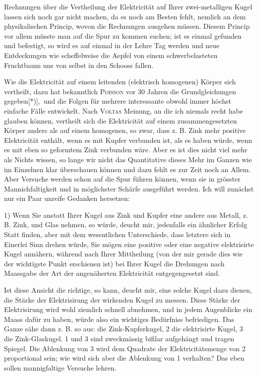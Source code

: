 Rechnungen über die Vertheilung der Elektricität auf Ihrer zwei-metalligen Kugel lassen sich noch gar nicht machen, da es noch am Besten fehlt, nemlich an dem  physikalischen Princip, wovon die Rechnungen ausgehen müssen. Diesem Princip vor allem müsste man auf die Spur zu kommen suchen; ist es einmal gefunden und befestigt, so wird es auf einmal in der Lehre Tag werden und neue Entdeckungen wie scheffelweise die Aepfel von einem schwerbelasteten Fruchtbaum uns von selbst in den Schooss fallen.

Wie die Elektricität auf einem leitenden (elektrisch homogenen) Körper sich vertheilt, dazu hat bekanntlich \textsc{Poisson} vor 30 Jahren die Grundgleichungen gegeben[*)],\begingroup\renewcommand{\thefootnote}{}\endgroup\ und die Folgen für mehrere interessante obwohl immer höchst einfache Fälle entwickelt. Nach \textsc{Voltas} Meinung, an die ich  niemals recht habe glauben können, vertheilt sich die Elektricität auf einem zusammengesetzten Körper anders als auf einem homogenen, so zwar, dass z. B. Zink mehr positive Elektricität enthält, wenn es mit Kupfer verbunden ist, als es haben würde, wenn es mit eben so geformtem Zink verbunden wäre. Aber es ist dies nicht viel mehr als Nichts wissen, so lange wir nicht das Quantitative dieses Mehr im Ganzen wie im Einzelnen klar überschauen können und dazu fehlt es zur Zeit noch an Allem. Aber Versuche werden schon auf die Spur führen können, wenn sie in grösster Mannichfaltigkeit und in möglichster Schärfe ausgeführt werden. Ich will zunächst nur ein Paar unreife Gedanken hersetzen:

1) Wenn Sie anstatt Ihrer Kugel aus Zink und Kupfer eine andere aus Metall, z. B. Zink, und Glas nehmen, so würde, deucht mir, jedenfalls ein ähnlicher Erfolg Statt finden, aber mit dem wesentlichen Unterschiede, dass letztere sich in Einerlei Sinn drehen würde, Sie mögen eine positive oder eine
\clearpage{}
\noindent negative elektrisirte Kugel annähern, während nach Ihrer Mittheilung (von der mir gerade dies wie der wichtigste Punkt erschienen ist) bei Ihrer Kugel die Drehungen nach Maassgabe der Art der angenäherten Elektricität entgegengesetzt sind.

Ist diese Ansicht die richtige, so kann, deucht mir, eine solche Kugel dazu dienen, die Stärke der Elektrisirung der wirkenden Kugel zu messen. Diese Stärke der Elektrisirung wird wohl ziemlich schnell abnehmen, und in jedem Augenblicke ein Maass dafür zu haben, würde also ein wichtiges Bedürfniss befriedigen. Das Ganze sähe dann z. B. so aus:
\EMThreeFigOne
{} die Zink-Kupferkugel, 2 die elektrisirte Kugel, 3 die Zink-Glaskugel. 1 und 3 sind zweckmässig bifilar aufgehängt und tragen Spiegel. Die Ablenkung von 3 wird dem Quadrate der Elektricitätsmenge von 2 proportional sein; wie wird sich aber die Ablenkung von 1 verhalten? Das eben sollen mannigfaltige Versuche lehren.

